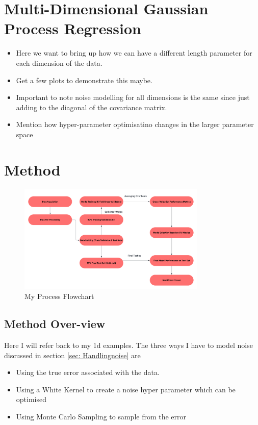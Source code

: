 \documentclass{article}
\begin{document}
\section{Multi-Dimensional Gaussian Process Regression}

\begin{itemize}
    \item Here we want to bring up how we can have a different length parameter for each dimension of the data.
    \item Get a few plots to demonstrate this maybe.
    \item Important to note noise modelling for all dimensions is the same since just adding to the diagonal of the covariance matrix.
    \item Mention how hyper-parameter optimisatino changes in the larger parameter space
\end{itemize}


\section{Method}

\begin{figure}[H]
    \centering
    \includegraphics[width=0.8\textwidth]{LatexPlots/Flowchart.png}
    \caption{My Process Flowchart}
    \label{fig:flowchart}
\end{figure}

\subsection{Method Over-view}
Here I will refer back to my 1d examples. The three ways I have to model noise discussed in section \ref{sec: Handlingnoise} are
\begin{itemize}
    \item Using the true error associated with the data.
    \item Using a White Kernel to create a noise hyper parameter which can be optimised
    \item Using Monte Carlo Sampling to sample from the error
\end{itemize}
\end{document}
